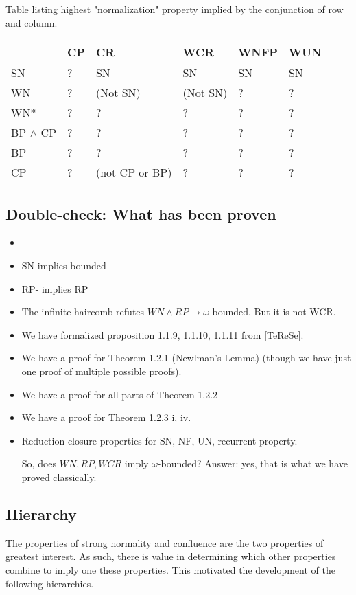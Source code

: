 \documentclass{scrartcl}
\begin{document}
Table listing highest "normalization" property implied
by the conjunction of row and column.


\begin{tabular}{@{}l@{\quad}l@{\quad}l@{\quad}l@{\quad}l@{\quad}l@{}}
  \toprule
  & CP & CR & WCR & WNFP & WUN \\
  \midrule
  SN  &?& SN & SN & SN & SN \\
  WN  &?& (Not SN) & (Not SN) & ? & ? \\
  WN*  &?& ? & ? & ? & ? \\
  BP $\land$ CP   &?& ? & ? & ? & ? \\
  BP  &?& ? & ? & ? & ? \\
  CP  &?& (not CP or BP) & ? & ? & ? \\
  \bottomrule
\end{tabular}

\subsection{Double-check: What has been proven}
\begin{itemize}
  \item {}
  \item SN implies bounded
  \item RP- implies RP
  \item The infinite haircomb refutes $WN \land RP \to \omega$-bounded.  But it is not WCR.
  \item We have formalized proposition 1.1.9, 1.1.10, 1.1.11 from [TeReSe].
  \item We have a proof for Theorem 1.2.1 (Newlman's Lemma) (though we have just one proof of multiple possible proofs).
  \item We have a proof for all parts of Theorem 1.2.2
  \item We have a proof for Theorem 1.2.3 i, iv.
  \item Reduction closure properties for SN, NF, UN, recurrent property.

  So, does $WN, RP, WCR$ imply $\omega$-bounded?
  Answer: yes, that is what we have proved classically.
\end{itemize}

\subsection{Hierarchy}
The properties of strong normality and confluence are the two properties of greatest interest. As such, there is 
value in determining which other properties combine to imply one these properties. This motivated the development of the 
following hierarchies. 
\end{document}

